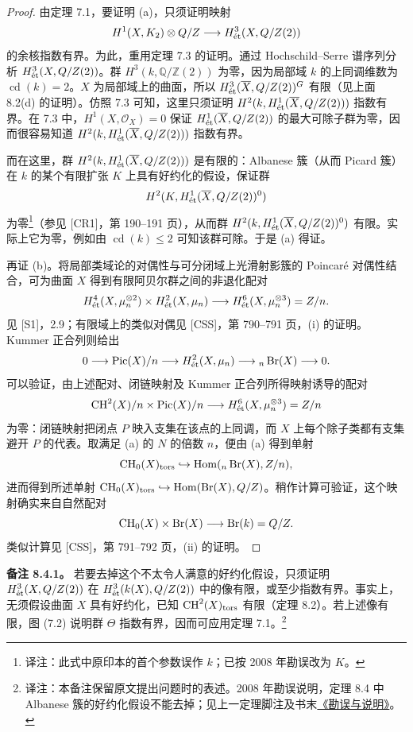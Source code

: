 \begin{proof}
由定理 7.1，要证明 (a)，只须证明映射
\[
 H^1(X,K_2)\otimes Q/Z
 \longrightarrow H^3_{\mathrm{\acute et}}(X,Q/Z(2))
\]
的余核指数有界。为此，重用定理 7.3 的证明。通过 Hochschild--Serre 谱序列分析 $H^3_{\mathrm{\acute et}}(X,Q/Z(2))$。群 $H^3(k,\mathbb Q/\mathbb Z(2))$ 为零，因为局部域 $k$ 的上同调维数为 $\operatorname{cd}(k)=2$。$X$ 为局部域上的曲面，所以 $H^3_{\mathrm{\acute et}}(\overline X,Q/Z(2))^G$ 有限（见上面 8.2(d) 的证明）。仿照 7.3 可知，这里只须证明
$H^2(k,H^1_{\mathrm{\acute et}}(\overline X,Q/Z(2)))$ 指数有界。在 7.3 中，$H^1(X,\mathcal O_X)=0$ 保证 $H^1_{\mathrm{\acute et}}(\overline X,Q/Z(2))$ 的最大可除子群为零，因而很容易知道 $H^2(k,H^1_{\mathrm{\acute et}}(\overline X,Q/Z(2)))$ 指数有界。

而在这里，群 $H^2(k,H^1_{\mathrm{\acute et}}(\overline X,Q/Z(2)))$ 是有限的：Albanese 簇（从而 Picard 簇）在 $k$ 的某个有限扩张 $K$ 上具有好约化的假设，保证群
\[
 H^2(K,H^1_{\mathrm{\acute et}}(\overline X,Q/Z(2))^0)
\]
为零\footnote{译注：此式中原印本的首个参数误作 $k$；已按 2008 年勘误改为 $K$。}（参见 [CR1]，第 190--191 页），从而群 $H^2(k,H^1_{\mathrm{\acute et}}(\overline X,Q/Z(2))^0)$ 有限。实际上它为零，例如由 $\operatorname{cd}(k)\le2$ 可知该群可除。于是 (a) 得证。

再证 (b)。将局部类域论的对偶性与可分闭域上光滑射影簇的 Poincaré 对偶性结合，可为曲面 $X$ 得到有限阿贝尔群之间的非退化配对
\[
 H^4_{\mathrm{\acute et}}(X,\mu_n^{\otimes2})\times H^2_{\mathrm{\acute et}}(X,\mu_n)
 \longrightarrow H^6_{\mathrm{\acute et}}(X,\mu_n^{\otimes3})=Z/n.
\]
见 [S1]，2.9；有限域上的类似对偶见 [CSS]，第 790--791 页，(i) 的证明。Kummer 正合列则给出
\[
 0\longrightarrow\operatorname{Pic}(X)/n\longrightarrow H^2_{\mathrm{\acute et}}(X,\mu_n)
 \longrightarrow{}_n\operatorname{Br}(X)\longrightarrow0.
\]
可以验证，由上述配对、闭链映射及 Kummer 正合列所得映射诱导的配对
\[
 \operatorname{CH}^2(X)/n\times\operatorname{Pic}(X)/n
 \longrightarrow H^6_{\mathrm{\acute et}}(X,\mu_n^{\otimes3})=Z/n
\]
为零：闭链映射把闭点 $P$ 映入支集在该点的上同调，而 $X$ 上每个除子类都有支集避开 $P$ 的代表。取满足 (a) 的 $N$ 的倍数 $n$，便由 (a) 得到单射
\[
 \operatorname{CH}_0(X)_{\mathrm{tors}}\hookrightarrow\operatorname{Hom}({}_n\operatorname{Br}(X),Z/n),
\]
进而得到所述单射 $\operatorname{CH}_0(X)_{\mathrm{tors}}\hookrightarrow\operatorname{Hom}(\operatorname{Br}(X),Q/Z)$。稍作计算可验证，这个映射确实来自自然配对
\[
 \operatorname{CH}_0(X)\times\operatorname{Br}(X)\longrightarrow\operatorname{Br}(k)=Q/Z.
\]
类似计算见 [CSS]，第 791--792 页，(ii) 的证明。
\end{proof}

\noindent\textbf{备注 8.4.1。} 若要去掉这个不太令人满意的好约化假设，只须证明 $H^3_{\mathrm{\acute et}}(X,Q/Z(2))$ 在 $H^3_{\mathrm{\acute et}}(k(X),Q/Z(2))$ 中的像有限，或至少指数有界。事实上，无须假设曲面 $X$ 具有好约化，已知 $\operatorname{CH}^2(X)_{\mathrm{tors}}$ 有限（定理 8.2）。若上述像有限，图 (7.2) 说明群 $\Theta$ 指数有界，因而可应用定理 7.1。\footnote{译注：本备注保留原文提出问题时的表述。2008 年勘误说明，定理 8.4 中 Albanese 簇的好约化假设不能去掉；见上一定理脚注及书末\hyperref[errata-ct]{《勘误与说明》}。}

